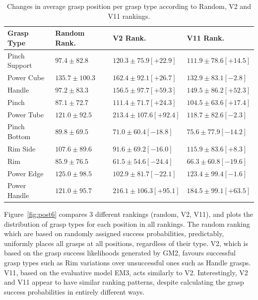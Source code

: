 \begin{table}[h]
\small
\centering
\begin{tabular}{llll}
\hline
Grasp Type & Random Rank. & V2 Rank.  & V11 Rank.\\ \hline
Pinch Support & $\mathbf{97.4} \pm 82.8$  & $\mathbf{120.3} \pm 75.9 [\mathbf{+22.9}]$ & $\mathbf{111.9} \pm 78.6 [\mathbf{+14.5}]$ \\ \hline
Power Cube & $\mathbf{135.7} \pm 100.3$  & $\mathbf{162.4} \pm 92.1 [\mathbf{+26.7}]$ & $\mathbf{132.9} \pm 83.1 [\mathbf{-2.8}]$ \\ \hline
Handle & $\mathbf{97.2} \pm 83.3$  & $\mathbf{156.5} \pm 97.7 [\mathbf{+59.3}]$ & $\mathbf{149.5} \pm 86.2 [\mathbf{+52.3}]$ \\ \hline
Pinch & $\mathbf{87.1} \pm 72.7$  & $\mathbf{111.4} \pm 71.7 [\mathbf{+24.3}]$ & $\mathbf{104.5 }\pm 63.6 [\mathbf{+17.4}]$ \\ \hline
Power Tube & $\mathbf{121.0} \pm 92.5$  & $\mathbf{213.4} \pm 107.6 [\mathbf{+92.4}]$ & $\mathbf{118.7} \pm 82.6 [\mathbf{-2.3}]$ \\ \hline
Pinch Bottom & $\mathbf{89.8} \pm 69.5$  & $\mathbf{71.0} \pm 60.4 [\mathbf{-18.8}]$ & $\mathbf{75.6} \pm 77.9 [\mathbf{-14.2}]$ \\ \hline
Rim Side & $\mathbf{107.6} \pm 89.6$  & $\mathbf{91.6} \pm 69.2 [\mathbf{-16.0}]$ & $\mathbf{115.9} \pm 83.6 [\mathbf{+8.3}]$ \\ \hline
Rim & $\mathbf{85.9} \pm 76.5$  & $\mathbf{61.5} \pm 54.6 [\mathbf{-24.4}]$ & $\mathbf{66.3} \pm 60.8 [\mathbf{-19.6}]$ \\ \hline
Power Edge & $\mathbf{125.0} \pm 98.5$  & $\mathbf{102.9} \pm 81.7 [\mathbf{-22.1}]$ & $\mathbf{123.4} \pm 99.4 [\mathbf{-1.6}]$ \\ \hline
Power Handle & $\mathbf{121.0} \pm 95.7$  & $\mathbf{216.1} \pm 106.3 [\mathbf{+95.1}]$ & $\mathbf{184.5} \pm 99.1 [\mathbf{+63.5}]$ \\ \hline
\end{tabular}
\caption{Changes in average grasp position per grasp type according to Random, V2 and V11 rankings.}
\label{table:rankingchanges}
\end{table}


Figure~\ref{fig:post6} compares 3 different rankings (random, V2, V11), and plots the distribution of grasp types for each position in all rankings. The random ranking which are based on randomly assigned success probabilities, predictably, uniformly places all grasps at all positions, regardless of their type. V2, which is based on the grasp success likelihoods generated by GM2, favours successful grasp types such as Rim variations over unsuccessful ones such as Handle grasps. V11, based on the evaluative model EM3, acts similarly to V2. Interestingly, V2 and V11 appear to have similar ranking patterns, despite calculating the grasp success probabilities in entirely different ways. 


